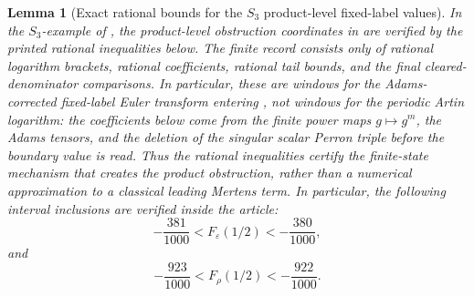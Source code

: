 \documentclass[11pt,a4paper]{amsart}
\theoremstyle{plain}
\newtheorem{lemma}[theorem]{Lemma}
\theoremstyle{definition}
\theoremstyle{remark}
\begin{document}
\begin{lemma}[Exact rational bounds for the \(S_3\) product-level fixed-label values]\label{lem:appendix-s3-f-level-certificates}
  In the \(S_3\)-example of , the product-level
  obstruction coordinates in  are
  verified by the printed rational inequalities below.  The finite record
  consists only of rational logarithm brackets, rational coefficients, rational
  tail bounds, and the final cleared-denominator comparisons.  In particular,
  these are windows for the Adams-corrected fixed-label Euler transform
  entering , not windows for the periodic
  Artin logarithm: the coefficients below come from the finite power maps
  \(g\mapsto g^m\), the Adams tensors, and the deletion of the singular scalar
  Perron triple before the boundary value is read.  Thus the rational
  inequalities certify the finite-state mechanism that creates the product
  obstruction, rather than a numerical approximation to a classical leading
  Mertens term.  In particular,
  the following interval inclusions are verified inside the article:
  \begin{equation}\label{eq:s3-f-epsilon-appendix-window}
    -\frac{381}{1000}<F_\varepsilon(1/2)<-\frac{380}{1000},
  \end{equation}
  and
  \begin{equation}\label{eq:s3-f-rho-appendix-window}
    -\frac{923}{1000}<F_\rho(1/2)<-\frac{922}{1000}.
  \end{equation}
\end{lemma}
\end{document}
